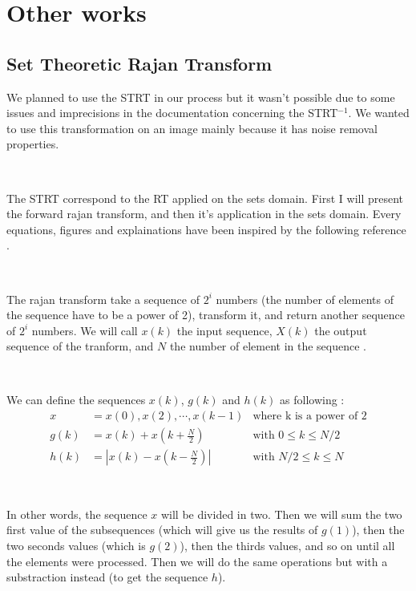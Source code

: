 \chapter{Other works}


\section{Set Theoretic Rajan Transform}

We planned to use the \gls{STRT} in our process but it wasn't possible due to some issues and imprecisions in the documentation concerning the \gls{STRT}$^{-1}$. We wanted to use this transformation on an image mainly because it has noise removal properties.

~~

The \gls{STRT} correspond to the \gls{RT} applied on the sets domain. First I will present the forward rajan transform, and then it's application in the sets domain. Every equations, figures and explainations have been inspired by the following reference  \cite{bib:symbolic:RajanTransform}.

~~

The rajan transform take a sequence of $2^{i}$ numbers (the number of elements of the sequence have to be a power of 2), transform it, and return another sequence of $2^{i}$ numbers. We will call $x(k)$ the input sequence, $X(k)$ the output sequence of the tranform, and $N$ the number of element in the sequence \cite{bib:symbolic:RajanTransform}. 

~~

We can define the sequences $x(k)$, $g(k)$ and $h(k)$ as following : 
\begin{align}
x &= x(0), x(2), \cdots, x(k-1) & \text{where k is a power of 2} \\
g(k) &= x(k) + x(k + \frac{N}{2}) & \text{with } 0 \leq k \leq N / 2 \\
h(k) &= | x(k) - x(k - \frac{N}{2}) | & \text{with } N / 2 \leq k \leq N
\end{align}

~~

In other words, the sequence $x$ will be divided in two. Then we will sum the two first value of the subsequences (which will give us the results of $g(1)$), then the two seconds values (which is $g(2)$), then the thirds values, and so on until all the elements were processed. Then we will do the same operations but with a substraction instead (to get the sequence $h$).

~~

